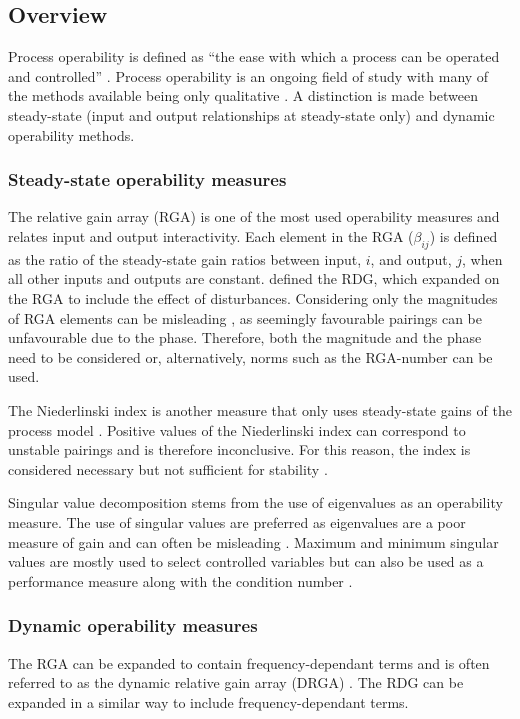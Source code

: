 \subsection{Overview}
Process operability is defined as ``the ease with which a process can be operated and controlled'' \citep[778]{marlin}.
Process operability is an ongoing field of study with many of the methods available being only qualitative \citep[164]{skogestad}. 
A distinction is made between steady-state (input and output relationships at steady-state only) and dynamic operability methods.

\subsubsection{Steady-state operability measures}
The relative gain array (RGA) is one of the most used operability measures \citep[576]{luyben} and relates input and output interactivity.
Each element in the RGA ($\beta_{ij}$) is defined as the ratio of the steady-state gain ratios between input, $i$, and output, $j$, when all other inputs and outputs are constant.
\citet{artrdg} defined the RDG, which expanded on the RGA to include the effect of disturbances. 
Considering only the magnitudes of RGA elements can be misleading \citep[87]{skogestad}, as seemingly favourable pairings can be unfavourable due to the phase.
Therefore, both the magnitude and the phase need to be considered or, alternatively, norms such as the RGA-number can be used.


The Niederlinski index is another measure that only uses steady-state gains of the process model \citep[572-573]{luyben}.
Positive values of the Niederlinski index can correspond to unstable pairings and is therefore inconclusive.
For this reason, the index is considered necessary but not sufficient for stability \citep[445]{skogestad}.

Singular value decomposition stems from the use of eigenvalues as an operability measure. 
The use of singular values are preferred as eigenvalues are a poor
measure of gain and can often be misleading \citep[75]{skogestad}.
Maximum and minimum singular values are mostly used to select controlled variables but can also be used as a performance measure along with the condition number .

\subsubsection{Dynamic operability measures}
The RGA can be expanded to contain frequency-dependant terms and is often referred to as the dynamic relative gain array (DRGA) \citep[637]{marlin}. 
The RDG \citep{artrdg} can be expanded in a similar way to include frequency-dependant terms.

